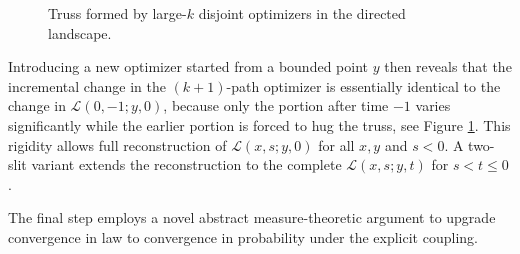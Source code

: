 \documentclass[11pt]{article}
\theoremstyle{definition} %
\theoremstyle{remark} %
\begin{document}
\begin{figure}[htbp]


\caption{Truss formed by large-\(k\) disjoint optimizers in the directed landscape.}
\label{f:truss}
\end{figure}

Introducing a new optimizer started from a bounded point \(y\) then reveals that the incremental change in the \((k+1)\)-path optimizer is essentially identical to the change in \(\mathcal{L}(0,-1;y,0)\), because only the portion after time \(-1\) varies significantly while the earlier portion is forced to hug the truss, see Figure \ref{f:truss}. This rigidity allows full reconstruction of \(\mathcal{L}(x,s;y,0)\) for all \(x,y\) and \(s<0\). A two-slit variant extends the reconstruction to the complete \(\mathcal{L}(x,s;y,t)\) for \(s<t\le 0\).

The final step employs a novel abstract measure-theoretic argument to upgrade convergence in law to convergence in probability under the explicit coupling.
\end{document}
